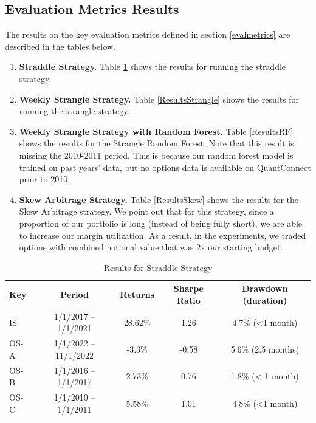 \documentclass[10pt]{article}
\theoremstyle{definition}
\begin{document}
\subsection{Evaluation Metrics Results}
The results on the key evaluation metrics defined in section \ref{evalmetrics} are described in the tables below. 
\begin{enumerate}
    \item \textbf{Straddle Strategy.} Table \ref{ResultsStraddle} shows the results for running the straddle strategy.
    \item \textbf{Weekly Strangle Strategy.} Table \ref{ResultsStrangle} shows the results for running the strangle strategy.
    \item \textbf{Weekly Strangle Strategy with Random Forest.} Table \ref{ResultsRF} shows the results for the Strangle Random Forest. Note that this result is missing the 2010-2011 period. This is because our random forest model is trained on past years' data, but no options data is available on QuantConnect prior to 2010. 
    \item \textbf{Skew Arbitrage Strategy.} Table \ref{ResultsSkew} shows the results for the Skew Arbitrage strategy. We point out that for this strategy, since a proportion of our portfolio is long (instead of being fully short), we are able to increase our margin utilization. As a result, in the experiments, we traded options with combined notional value that was 2x our starting budget.
\end{enumerate}

\begin{table}[t]
\begin{center}
\begin{tabular}{@{}lcccc @{}}
\toprule
\textbf{Key} & \textbf{Period}      & \textbf{Returns} & \textbf{Sharpe Ratio} & \textbf{Drawdown (duration)} \\ \midrule
IS & 1/1/2017 – 1/1/2021  & 28.62\%  & 1.26 & 4.7\% (<1 month)\\
OS-A & 1/1/2022 – 11/1/2022 &  -3.3\% & -0.58 & 5.6\% (2.5 months) \\
OS-B & 1/1/2016 – 1/1/2017  & 2.73\%   & 0.76 &  1.8\% (< 1 month)\\
OS-C &  1/1/2010 – 1/1/2011  &  5.58\% & 1.01 & 4.8\% (<1 month) \\\midrule
\end{tabular}
\caption{Results for Straddle Strategy}
\label{ResultsStraddle}
\end{center}
\end{table}
\end{document}
